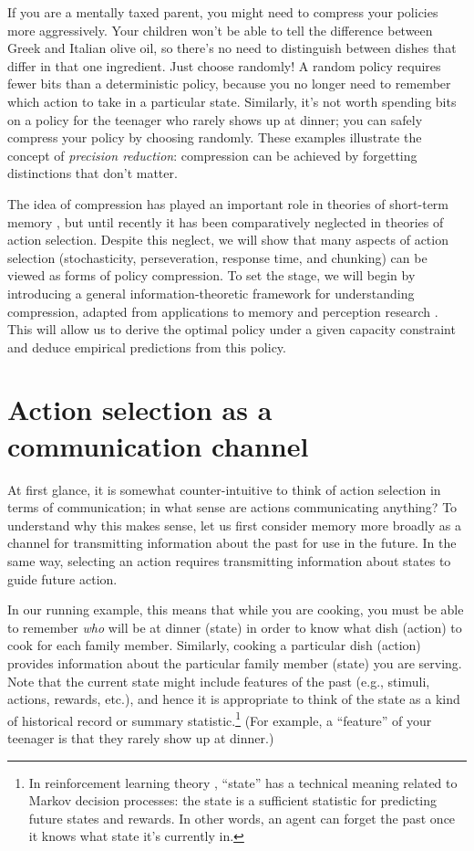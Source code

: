 \documentclass[11pt]{article}
\begin{document}
If you are a mentally taxed parent, you might need to compress your policies more aggressively. Your children won't be able to tell the difference between Greek and Italian olive oil, so there's no need to distinguish between dishes that differ in that one ingredient. Just choose randomly! A random policy requires fewer bits than a deterministic policy, because you no longer need to remember which action to take in a particular state. Similarly, it's not worth spending bits on a policy for the teenager who rarely shows up at dinner; you can safely compress your policy by choosing randomly. These examples illustrate the concept of \emph{precision reduction}: compression can be achieved by forgetting distinctions that don't matter.

The idea of compression has played an important role in theories of short-term memory \citep{miller56,brady09,nassar18,mathy12,norris20}, but until recently it has been comparatively neglected in theories of action selection. Despite this neglect, we will show that many aspects of action selection (stochasticity, perseveration, response time, and chunking) can be viewed as forms of policy compression. To set the stage, we will begin by introducing a general information-theoretic framework for understanding compression, adapted from applications to memory and perception research \citep{gershman21,sims16}. This will allow us to derive the optimal policy under a given capacity constraint and deduce empirical predictions from this policy.

\section{Action selection as a communication channel}

At first glance, it is somewhat counter-intuitive to think of action selection in terms of communication; in what sense are actions communicating anything? To understand why this makes sense, let us first consider memory more broadly as a channel for transmitting information about the past for use in the future. In the same way, selecting an action requires transmitting information about states to guide future action. 

In our running example, this means that while you are cooking, you must be able to remember \textit{who} will be at dinner (state) in order to know what dish (action) to cook for each family member. Similarly, cooking a particular dish (action) provides information about the particular family member (state) you are serving. Note that the current state might include features of the past (e.g., stimuli, actions, rewards, etc.), and hence it is appropriate to think of the state as a kind of historical record or summary statistic.\footnote{In reinforcement learning theory \citep{sutton18}, ``state'' has a technical meaning related to Markov decision processes: the state is a sufficient statistic for predicting future states and rewards. In other words, an agent can forget the past once it knows what state it's currently in.} (For example, a ``feature'' of your teenager is that they rarely show up at dinner.) 
\end{document}
